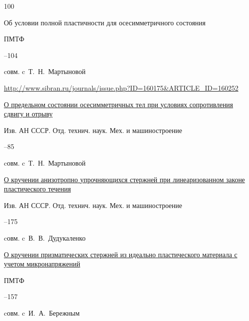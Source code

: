 \begin{thebibliography}{100}

\paper Об условии полной пластичности для осесимметричного состояния 

\jour ПМТФ



–104 

\miscnote cовм. c~Т.~Н.~Мартыновой

\elink \url{http://www.sibran.ru/journals/issue.php?ID=160175&ARTICLE_ID=160252}




\paper  \href{https://zbmath.org/?q=an:0125.13501}{О предельном состоянии осесимметричных тел при условиях сопротивления сдвигу и отрыву}

\jour Изв. АН СССР. Отд. технич. наук. Мех. и машиностроение



–85 

\miscnote cовм. c~Т.~Н.~Мартыновой





\paper \href{https://zbmath.org/?q=an:0122.19104}{О кручении анизотропно упрочняющихся стержней при линеаризованном законе пластического течения}

\jour Изв. АН СССР. Отд. технич. наук. Мех. и машиностроение



–175 

\miscnote cовм. c~В.~В.~Дудукаленко





\paper \href{https://zbmath.org/?q=an:0128.18504}{О кручении призматических стержней из идеально пластического материала с учетом микронапряжений}

\jour ПМТФ



–157 

\miscnote cовм. c~И.~А.~Бережным



\end{thebibliography}
